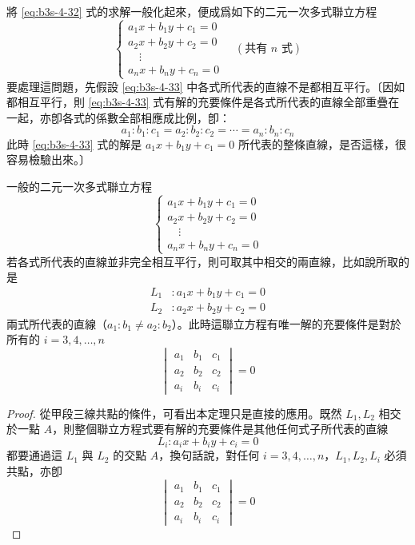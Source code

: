 將 \eqref{eq:b3s-4-32} 式的求解一般化起來，便成爲如下的二元一次多式聯立方程
\begin{equation}
\begin{cases}
a_1 x + b_1 y + c_1 = 0 \\
a_2 x + b_2 y + c_2 = 0 \\
\quad \vdots \\
a_n x + b_n y + c_n = 0
\end{cases} \quad (\text{共有 } n \text{ 式})
\label{eq:b3s-4-33}
\end{equation}
要處理這問題，先假設 \eqref{eq:b3s-4-33} 中各式所代表的直線不是都相互平行。〔因如都相互平行，則 \eqref{eq:b3s-4-33} 式有解的充要條件是各式所代表的直線全部重疊在一起，亦卽各式的係數全部相應成比例，卽：
\[
a_1 : b_1 : c_1 = a_2 : b_2 : c_2 = \cdots = a_n : b_n : c_n
\]
此時 \eqref{eq:b3s-4-33} 式的解是 $a_1 x + b_1 y + c_1 = 0$ 所代表的整條直線，是否這樣，很容易檢驗出來。〕

\begin{theorem}
一般的二元一次多式聯立方程
\begin{equation}
\begin{cases}
a_1 x + b_1 y + c_1 = 0 \\
a_2 x + b_2 y + c_2 = 0 \\
\quad \vdots \\
a_n x + b_n y + c_n = 0
\end{cases}
\label{eq:b3s-4-34}
\end{equation}
若各式所代表的直線並非完全相互平行，則可取其中相交的兩直線，比如說所取的是
\begin{align*}
L_1 &: a_1 x + b_1 y + c_1 = 0 \\
L_2 &: a_2 x + b_2 y + c_2 = 0
\end{align*}
兩式所代表的直線（$a_1 : b_1 \neq a_2 : b_2$）。此時這聯立方程有唯一解的充要條件是對於所有的 $i = 3, 4, \dots, n$
\begin{equation}
\begin{vmatrix}
a_1 & b_1 & c_1 \\
a_2 & b_2 & c_2 \\
a_i & b_i & c_i
\end{vmatrix} = 0
\label{eq:b3s-4-35}
\end{equation}
\end{theorem}

\begin{proof}
從甲段三線共點的條件，可看出本定理只是直接的應用。既然 $L_1, L_2$ 相交於一點 $A$，則整個聯立方程式要有解的充要條件是其他任何式子所代表的直線
\[
L_i : a_i x + b_i y + c_i = 0
\]
都要通過這 $L_1$ 與 $L_2$ 的交點 $A$，換句話說，對任何 $i = 3, 4, \dots, n$，$L_1, L_2, L_i$ 必須共點，亦卽
\[
\begin{vmatrix}
a_1 & b_1 & c_1 \\
a_2 & b_2 & c_2 \\
a_i & b_i & c_i
\end{vmatrix} = 0
\]
\end{proof}

